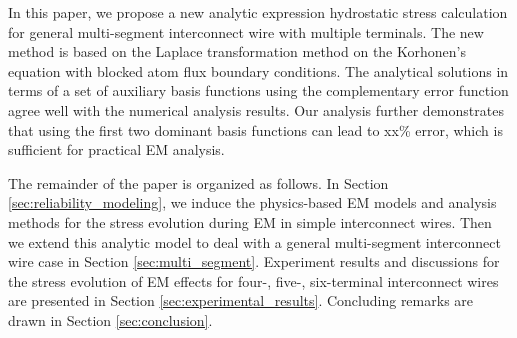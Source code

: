 In this paper, we propose a new analytic expression hydrostatic stress
calculation for general multi-segment interconnect wire with multiple
terminals. The new method is based on the Laplace transformation
method on the Korhonen's equation with blocked atom flux boundary
conditions. The analytical solutions in terms of a set of auxiliary
basis functions using the complementary error function agree well with
the numerical analysis results. Our analysis further demonstrates that
using the first two dominant basis functions can lead to xx\% error,
which is sufficient for practical EM analysis.

The remainder of the paper is organized as follows. In Section
\ref{sec:reliability_modeling}, we induce the physics-based EM models and analysis methods for the stress evolution during EM in simple interconnect wires. Then we extend this analytic model to deal with a general multi-segment interconnect wire case in Section \ref{sec:multi_segment}. Experiment results and discussions for the stress evolution of EM effects for four-, five-, six-terminal interconnect wires are presented in Section \ref{sec:experimental_results}. Concluding remarks are drawn in Section \ref{sec:conclusion}.



